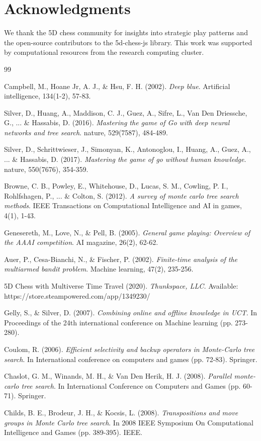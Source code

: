 \documentclass[11pt,a4paper]{article}
\begin{document}
\section{Acknowledgments}

We thank the 5D chess community for insights into strategic play patterns and the open-source contributors to the 5d-chess-js library. This work was supported by computational resources from the research computing cluster.

\begin{thebibliography}{99}

Campbell, M., Hoane Jr, A. J., \& Hsu, F. H. (2002).
\textit{Deep blue}.
Artificial intelligence, 134(1-2), 57-83.

Silver, D., Huang, A., Maddison, C. J., Guez, A., Sifre, L., Van Den Driessche, G., ... \& Hassabis, D. (2016).
\textit{Mastering the game of Go with deep neural networks and tree search}.
nature, 529(7587), 484-489.

Silver, D., Schrittwieser, J., Simonyan, K., Antonoglou, I., Huang, A., Guez, A., ... \& Hassabis, D. (2017).
\textit{Mastering the game of go without human knowledge}.
nature, 550(7676), 354-359.

Browne, C. B., Powley, E., Whitehouse, D., Lucas, S. M., Cowling, P. I., Rohlfshagen, P., ... \& Colton, S. (2012).
\textit{A survey of monte carlo tree search methods}.
IEEE Transactions on Computational Intelligence and AI in games, 4(1), 1-43.

Genesereth, M., Love, N., \& Pell, B. (2005).
\textit{General game playing: Overview of the AAAI competition}.
AI magazine, 26(2), 62-62.

Auer, P., Cesa-Bianchi, N., \& Fischer, P. (2002).
\textit{Finite-time analysis of the multiarmed bandit problem}.
Machine learning, 47(2), 235-256.

5D Chess with Multiverse Time Travel (2020).
\textit{Thunkspace, LLC.}
Available: https://store.steampowered.com/app/1349230/

Gelly, S., \& Silver, D. (2007).
\textit{Combining online and offline knowledge in UCT}.
In Proceedings of the 24th international conference on Machine learning (pp. 273-280).

Coulom, R. (2006).
\textit{Efficient selectivity and backup operators in Monte-Carlo tree search}.
In International conference on computers and games (pp. 72-83). Springer.

Chaslot, G. M., Winands, M. H., \& Van Den Herik, H. J. (2008).
\textit{Parallel monte-carlo tree search}.
In International Conference on Computers and Games (pp. 60-71). Springer.

Childs, B. E., Brodeur, J. H., \& Kocsis, L. (2008).
\textit{Transpositions and move groups in Monte Carlo tree search}.
In 2008 IEEE Symposium On Computational Intelligence and Games (pp. 389-395). IEEE.

\end{thebibliography}
\end{document}
